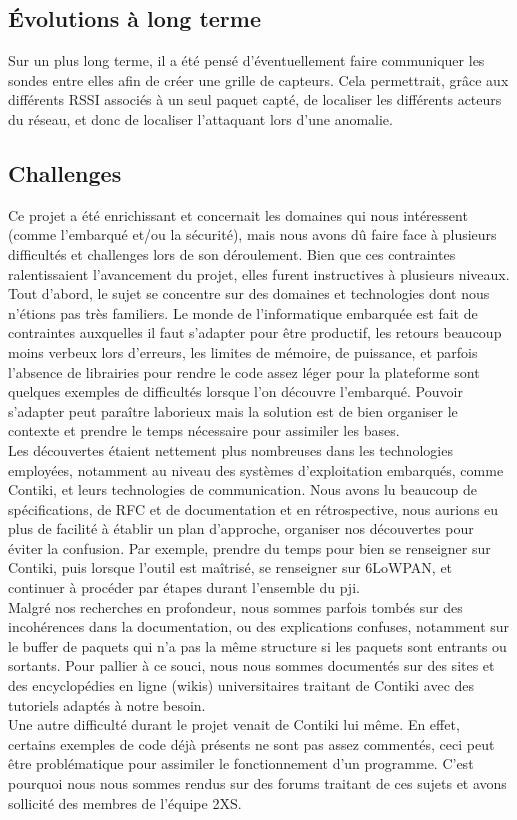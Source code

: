 	\subsection{Évolutions à long terme} %
	Sur un plus long terme, il a été pensé d'éventuellement faire communiquer les sondes entre elles afin de créer une grille de capteurs.
	Cela permettrait, grâce aux différents RSSI associés à un seul paquet capté, de localiser les différents acteurs du réseau, et donc de localiser l'attaquant lors d'une anomalie.
	\subsection{Challenges} %
	    Ce projet a été enrichissant et concernait les domaines qui nous intéressent (comme l'embarqué et/ou la sécurité), mais nous avons dû faire face à plusieurs difficultés et challenges lors de son déroulement. Bien que ces contraintes ralentissaient l'avancement du projet, elles furent instructives à plusieurs niveaux.\\
	    Tout d'abord, le sujet se concentre sur des domaines et technologies dont nous n'étions pas très familiers. Le monde de l'informatique embarquée est fait de contraintes auxquelles il faut s'adapter pour être productif, les retours beaucoup moins verbeux lors d'erreurs, les limites de mémoire, de puissance, et parfois l'absence de librairies pour rendre le code assez léger pour la plateforme sont quelques exemples de difficultés lorsque l'on découvre l'embarqué. Pouvoir s'adapter peut paraître laborieux mais la solution est de bien organiser le contexte et prendre le temps nécessaire pour assimiler les bases.\\
	    Les découvertes étaient nettement plus nombreuses dans les technologies employées, notamment au niveau des systèmes d'exploitation embarqués, comme Contiki, et leurs technologies de communication. Nous avons lu beaucoup de spécifications, de RFC et de documentation et en rétrospective, nous aurions eu plus de facilité à établir un plan d'approche, organiser nos découvertes pour éviter la confusion. Par exemple, prendre du temps pour bien se renseigner sur Contiki, puis lorsque l'outil est maîtrisé, se renseigner sur 6LoWPAN, et continuer à procéder par étapes durant l'ensemble du pji.\\
	    Malgré nos recherches en profondeur, nous sommes parfois tombés sur des incohérences dans la documentation, ou des explications confuses, notamment sur le buffer de paquets qui n'a pas la même structure si les paquets sont entrants ou sortants. Pour pallier à ce souci, nous nous sommes documentés sur des sites et des encyclopédies en ligne (wikis) universitaires traitant de Contiki avec des tutoriels adaptés à notre besoin.\\
	    Une autre difficulté durant le projet venait de Contiki lui même. En effet, certains exemples de code déjà présents ne sont pas assez commentés, ceci peut être problématique pour assimiler le fonctionnement d'un programme. C'est pourquoi nous nous sommes rendus sur des forums traitant de ces sujets et avons sollicité des membres de l'équipe 2XS.

